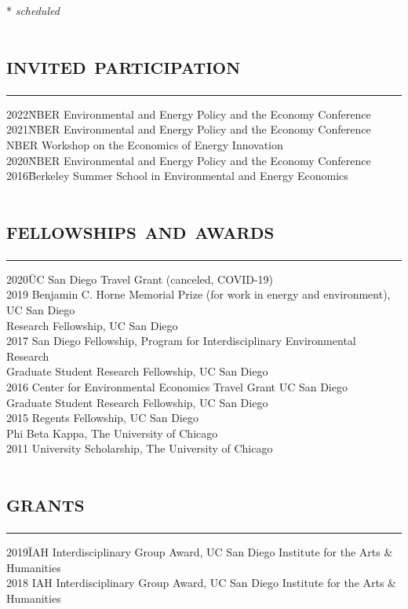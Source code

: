 \documentclass[letterpaper]{article}
\begin{document}
{* \emph{scheduled}

\section*{\textsc{\textbf{invited participation}}}
\hrule 
\vspace{.2cm}
\begin{tabbing}
2022\quad \= NBER Environmental and Energy Policy and the Economy Conference \\ 
2021\quad \= NBER Environmental and Energy Policy and the Economy Conference \\
\> NBER Workshop on the Economics of Energy Innovation \\
2020\quad \= NBER Environmental and Energy Policy and the Economy Conference\\ 
2016\quad \= Berkeley Summer School in Environmental and Energy Economics

\end{tabbing}

\section*{\textsc{\textbf{fellowships and awards}}}
\hrule
\vspace{.2cm}
\begin{tabbing}
2020\quad \= UC San Diego Travel Grant (canceled, COVID-19) \\
2019\quad \> Benjamin C. Horne Memorial Prize (for work in energy and environment), UC San Diego\\
  \> Research Fellowship, UC San Diego \\
2017  \> San Diego Fellowship, Program for Interdisciplinary Environmental Research \\
 \> Graduate Student Research Fellowship, UC San Diego\\
2016 \> Center for Environmental Economics Travel Grant UC San Diego \\ 
\> Graduate Student Research Fellowship, UC San Diego\\
2015 \> Regents Fellowship, UC San Diego \\
\> Phi Beta Kappa, The University of Chicago\\
2011 \> University Scholarship, The University of Chicago
\end{tabbing}


\section*{\textsc{\textbf{grants}}}
\hrule
\vspace{.2cm}
\begin{tabbing}
2019\quad \= IAH Interdisciplinary Group Award, UC San Diego Institute for the Arts \& Humanities \\ %
2018  \> IAH Interdisciplinary Group Award, UC San Diego Institute for the Arts \& Humanities %
\end{tabbing}


}
\end{document}
